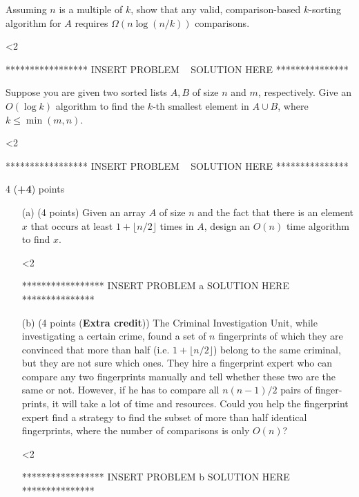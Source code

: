 Assuming $n$ is a multiple of $k$, show that any valid,
comparison-based $k$-sorting algorithm for $A$ requires $\Omega(n \log
{(n/k)})$ comparisons. 

\ifnum\me<2
\begin{solution}
***************** INSERT PROBLEM \prob~ SOLUTION HERE ***************
\end{solution}
\fi


Suppose you are given two sorted lists $A, B$ of size $n$ and $m$,
respectively. Give an $O(\log k)$ algorithm to find the $k$-th
smallest element in $A \cup B$, where $k \leq \min(m,n)$.

\ifnum\me<2
\begin{solution}
***************** INSERT PROBLEM \prob~ SOLUTION HERE ***************
\end{solution}
\fi

 {4 (\textbf{+4}) points}

\begin{itemize}

\item[(a)] (4 points) Given an array $A$ of size $n$ and the fact that
  there is an element $x$ that occurs at least $1 + \lfloor n/2
  \rfloor$ times in $A$, design an $O(n)$ time algorithm to find $x$.

\ifnum\me<2
\begin{solution}
***************** INSERT PROBLEM \prob a SOLUTION HERE ***************
\end{solution}
\fi

\item[(b)] (4 points (\textbf{Extra credit})) The Criminal
  Investigation Unit, while investigating a certain crime, found a set
  of $n$ fingerprints of which they are convinced that more than half
  (i.e. $1 + \lfloor n/2 \rfloor$) belong to the same criminal, but
  they are not sure which ones. They hire a fingerprint expert who can
  compare any two fingerprints manually and tell whether these two are
  the same or not.  However, if he has to compare all $n(n-1)/2$ pairs
  of finger-prints, it will take a lot of time and resources.  Could
  you help the fingerprint expert find a strategy to find the subset
  of more than half identical fingerprints, where the number of
  comparisons is only $O(n)$?  

\ifnum\me<2
\begin{solution}
***************** INSERT PROBLEM \prob b SOLUTION HERE ***************
\end{solution}
\fi

\end{itemize}

